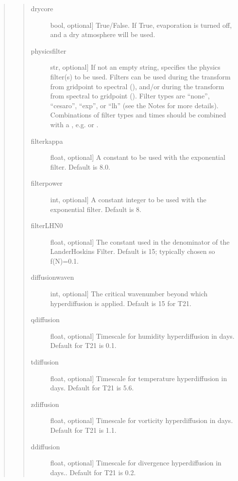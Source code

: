 \documentclass[letterpaper,10pt,english]{sphinxmanual}
\begin{document}
\begin{fulllineitems}
\begin{fulllineitems}
\begin{quote}
\begin{quote}
\begin{description}
\item[{drycore}] \leavevmode{[}bool, optional{]}
True/False. If True, evaporation is turned off, and a dry atmosphere will
be used.

\item[{physicsfilter}] \leavevmode{[}str, optional{]}
If not an empty string, specifies the physics filter(s) to be used. Filters
can be used during the transform from gridpoint to spectral (), and/or
during the transform from spectral to gridpoint (). Filter types are
“none”, “cesaro”, “exp”, or “lh” (see the Notes for more details).
Combinations of filter types and times should be combined with a \sphinxcode{\sphinxupquote{|}},
e.g.  or .

\item[{filterkappa}] \leavevmode{[}float, optional{]}
A constant to be used with the exponential filter. Default is 8.0.

\item[{filterpower}] \leavevmode{[}int, optional{]}
A constant integer to be used with the exponential filter. Default is 8.

\item[{filterLHN0}] \leavevmode{[}float, optional{]}
The constant used in the denominator of the Lander\sphinxhyphen{}Hoskins Filter. Default
is 15; typically chosen so f(N)=0.1.

\item[{diffusionwaven}] \leavevmode{[}int, optional{]}
The critical wavenumber beyond which hyperdiffusion is applied. Default
is 15 for T21.

\item[{qdiffusion}] \leavevmode{[}float, optional{]}
Timescale for humidity hyperdiffusion in days. Default for T21 is 0.1.

\item[{tdiffusion}] \leavevmode{[}float, optional{]}
Timescale for temperature hyperdiffusion in days. Default for T21 is 5.6.

\item[{zdiffusion}] \leavevmode{[}float, optional{]}
Timescale for vorticity hyperdiffusion in days. Default for T21 is 1.1.

\item[{ddiffusion}] \leavevmode{[}float, optional{]}
Timescale for divergence hyperdiffusion in days.. Default for T21 is 0.2.


\end{description}
\end{quote}
\end{quote}
\end{fulllineitems}
\end{fulllineitems}
\end{document}

